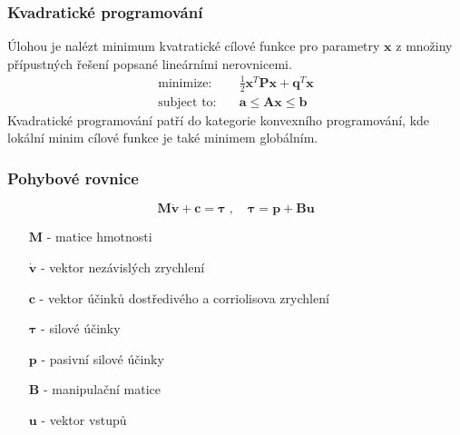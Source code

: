 \begin{frame}
	\frametitle{Kvadratické programování}
	Úlohou je nalézt minimum kvatratické cílové funkce pro parametry $\bm{x}$ z množiny přípustných řešení popsané lineárními nerovnicemi.
	\begin{align*}
		\text{minimize:}& \quad \frac{1}{2}\bm{x}^T\!\bm{P}\bm{x} + \bm{q}^T\!\bm{x} \\ 
		\text{subject to:}& \quad \bm{a} \leq \bm{A}\bm{x} \leq \bm{b}
	\end{align*} \cite{osqp}
	Kvadratické programování patří do kategorie konvexního programování, kde lokální minim cílové funkce je také minimem globálním. \cite{convex}
\end{frame}

\begin{frame}
	\frametitle{Pohybové rovnice}
	
	\begin{equation*}
		\bm{M} \bm{\dot{v}} + \bm{c} = \bm{\tau}
		\;,\quad \bm{\tau} = \bm{p} + \bm{B}\bm{u}
	\end{equation*}
	\begin{itemize}
		\item [$\bm{M}$] - matice hmotnosti
		\item [$\bm{\dot{v}}$] - vektor nezávislých zrychlení
		\item [$\bm{c}$] - vektor účinků dostředivého a corriolisova zrychlení
		\item [$\bm{\tau}$] - silové účinky
		\item [$\bm{p}$] - pasivní silové účinky
		\item [$\bm{B}$] - manipulační matice
		\item [$\bm{u}$] - vektor vstupů
	\end{itemize}
\end{frame}